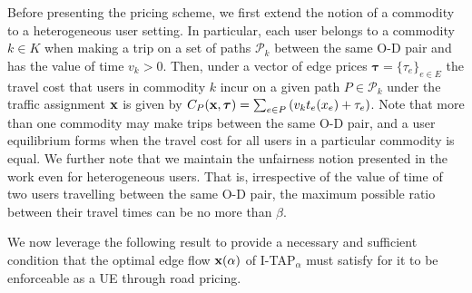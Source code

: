 \documentclass{article}
\newif\ifarxiv   %
\begin{document}
Before presenting the pricing scheme, we first extend the notion of a commodity to a heterogeneous user setting. In particular, each user belongs to a commodity $k \in K$ when making a trip on a set of paths $\mathcal{P}_k$ between the same O-D pair and has the value of time $v_k>0$. Then, under a vector of edge prices $\boldsymbol{\tau} = \{\tau_e\}_{e \in E}$ the travel cost that users in commodity $k$ incur on a given path $P \in \mathcal{P}_k$ under the traffic assignment $\mathbf{x}$ is given by $C_{P}(\mathbf{x}, \boldsymbol{\tau}) =  \sum_{e \in P} \left( v_k t_e(x_e) + \tau_e \right)$. Note that %
more than one commodity %
may make trips between the same O-D pair, and a user equilibrium forms when the travel cost for all users in a particular commodity is equal. We further note that we maintain the unfairness notion presented in the work \ifarxiv thus far \fi even for heterogeneous users. That is, irrespective of the value of time of two users travelling between the same O-D pair, the maximum possible ratio between their travel times can be no more than $\beta$.

We now leverage the following result 
to provide a necessary and sufficient condition that the optimal edge flow $\mathbf{x}(\alpha)$ of I-TAP$_{\alpha}$ \ifarxiv for any $\alpha\in [0,1]$ \fi must satisfy for it to be enforceable as a UE through road pricing. %




\end{document}
